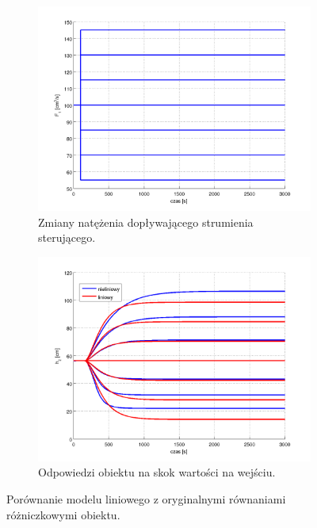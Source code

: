 \documentclass[a4paper,12pt]{article}
\begin{document}
\begin{figure}[h]
   \centering
   \begin{subfigure}[h]{0.45\textwidth}
      \includegraphics[width=\textwidth]{img/symulacja_z_liniowym_1a.png}
      \caption{Zmiany natężenia dopływającego strumienia sterującego.}
   \end{subfigure}
   \begin{subfigure}[h]{0.45\textwidth}
      \includegraphics[width=\textwidth]{img/symulacja_z_liniowym_1b.png}
      \caption{Odpowiedzi obiektu na skok wartości na wejściu.}
   \end{subfigure}
   \caption{Porównanie modelu liniowego z oryginalnymi równaniami różniczkowymi obiektu.}
   \label{img:symulacja_z_liniowym}
\end{figure}
\end{document}
